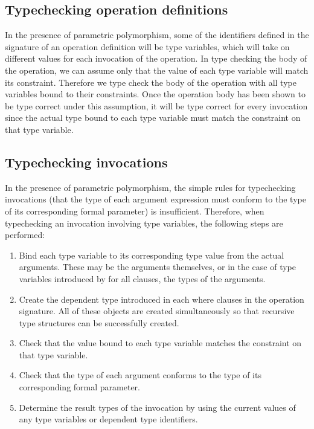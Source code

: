 \subsection{Typechecking operation definitions}
In the presence of parametric polymorphism, some of the identifiers defined
in the signature of an operation definition will be type variables, which
will take on 
different values for each invocation of the operation.  In type checking the
body of the operation, we can assume only that the value of each type
variable will match its constraint.  Therefore we type check the body of the
operation with all type variables bound to their constraints.  Once the
operation body has been shown to be type correct under this assumption, it
will be type correct for every invocation since the actual type bound to each
type variable must match the constraint on that type variable.

\subsection{Typechecking invocations}
In the presence of parametric polymorphism, the simple rules for
typechecking invocations (that the type of each argument expression must
conform to the type of its corresponding formal parameter) is insufficient.
Therefore, when typechecking an invocation involving type variables, the
following steps are performed:
\begin{enumerate}
  \item{} Bind each type variable to its corresponding type value from the
    actual arguments.  These may be the arguments themselves, or in the case
    of type variables introduced by for all clauses, the types of the
    arguments. 
  \item{} Create the dependent type introduced in each where clauses in the
    operation signature.  All of these objects are created simultaneously so
    that recursive type structures can be successfully created.
  \item{} Check that the value bound to each type variable matches the
    constraint on that type variable.
  \item{} Check that the type of each argument conforms to the type of its
    corresponding formal parameter.
  \item{} Determine the result types of the invocation by using the current
    values of any type variables or dependent type identifiers.
\end{enumerate}
